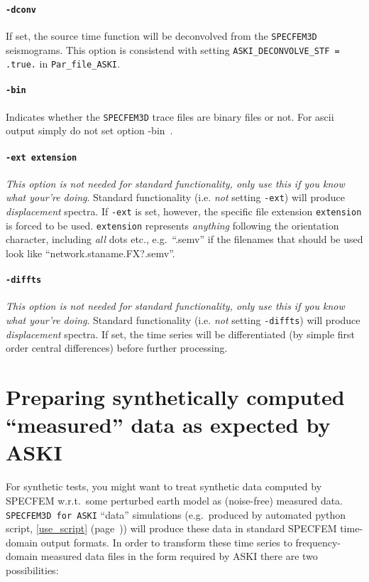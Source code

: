 \documentclass[12pt,a4paper]{article}
\newcommand{\lcode}[1]{\nolinkurl{#1}}
\newcommand{\ASKI}{ {\ttfamily ASKI} }
\newcommand{\myref}[1]{\ref{#1} (page~\pageref{#1})}
\begin{document}
\paragraph{\lcode{-dconv}}
If set, the source time function will be deconvolved from the \lcode{SPECFEM3D} seismograms. This option
is consistend with setting \lcode{ASKI_DECONVOLVE_STF = .true.} in \lcode{Par_file_ASKI}.

\paragraph{\lcode{-bin}}
Indicates whether the \lcode{SPECFEM3D} trace files are binary files or not. For ascii output simply 
do not set option -bin~.

\paragraph{\lcode{-ext extension}}
\emph{This option is not needed for standard functionality, only use this if you know what your're doing}.
Standard functionality (i.e. \emph{not} setting \lcode{-ext}) will produce \emph{displacement} spectra.
If \lcode{-ext} is set, however, the specific file extension \lcode{extension} is forced to be used. 
\lcode{extension} represents \emph{anything} following the orientation character, including 
\emph{all} dots etc., e.g.\ ``.semv'' if the filenames that should be used look like ``network.staname.FX?.semv''.


\paragraph{\lcode{-diffts}}
\emph{This option is not needed for standard functionality, only use this if you know what your're doing}.
Standard functionality (i.e. \emph{not} setting \lcode{-diffts}) will produce \emph{displacement} spectra.
If set, the time series will be differentiated (by simple first order central differences) before further 
processing.

%
\section{Preparing synthetically computed ``measured'' data as expected by \ASKI{}}
%
For synthetic tests, you might want to treat synthetic data computed by SPECFEM w.r.t.\ some perturbed earth model
as (noise-free) measured data. \lcode{SPECFEM3D for ASKI} ``data'' simulations (e.g.\ produced by automated 
python script, \myref{use_script}) will produce these data in standard SPECFEM time-domain output formats. 
In order to transform these time series to frequency-domain measured data files in the form required by \ASKI{}
there are two possibilities: 
\end{document}
